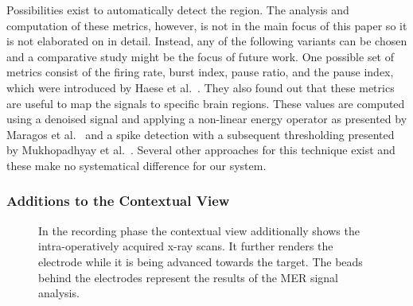 \documentclass[review]{vgtc}                 %
\begin{document}
Possibilities exist to automatically detect the region. The analysis and computation of these metrics, however, is not in the main focus of this paper so it is not elaborated on in detail. Instead, any of the following variants can be chosen and a comparative study might be the focus of future work. One possible set of metrics consist of the firing rate, burst index, pause ratio, and the pause index, which were introduced by Haese et al.~\cite{Haese2005}. They also found out that these metrics are useful to map the signals to specific brain regions. These values are computed using a denoised signal and applying a non-linear energy operator as presented by Maragos et al.~\cite{Maragos1993} and a spike detection with a subsequent thresholding presented by Mukhopadhyay et al.~\cite{Mukhopadhyay1998}. Several other approaches for this technique exist and these make no systematical difference for our system.

\subsubsection{Additions to the Contextual View}\label{sec:overview:recording:3d}
\begin{figure}
    \centering
    \caption{In the recording phase the contextual view additionally shows the intra-operatively acquired x-ray scans. It further renders the electrode while it is being advanced towards the target. The beads behind the electrodes represent the results of the MER signal analysis.}
    \label{fig:recordingphase:3d}
\end{figure}
\end{document}
